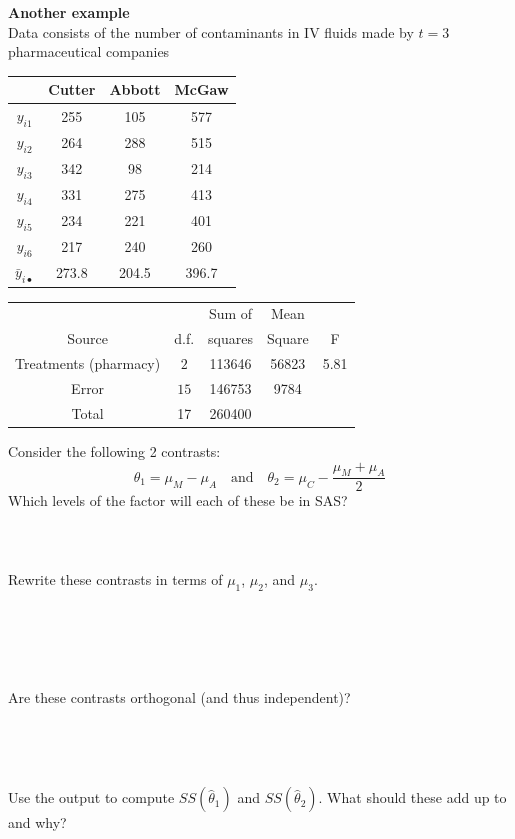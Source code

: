 \newpage

\textbf{Another example}\\
Data consists of the number of contaminants in IV fluids made by $t=3$ pharmaceutical companies
\begin{center}
\begin{tabular}{c|ccc|} \hline
&Cutter & Abbott & McGaw \\ \hline
$y_{i1}$&255 & 105 & 577 \\
$y_{i2}$&264 & 288 & 515 \\
$y_{i3}$&342 & 98 & 214 \\
$y_{i4}$&331 & 275 & 413 \\
$y_{i5}$&234 & 221 & 401 \\
$y_{i6}$&217 & 240 & 260 \\ \hline
$\bar{y}_{i\bullet}$ &273.8 & 204.5 & 396.7 \\ \hline
\end{tabular}
\end{center}
\begin{center}
\begin{tabular}{|c|c|c|c|c|}  \hline
& & Sum of & Mean & \\
Source & d.f. & squares & Square & F \\ \hline
Treatments (pharmacy) & $2$ & 113646 & 56823 & 5.81\\
Error & $15$ & 146753 & 9784 & \\
Total & 17 & 260400 & & \\ \hline
\end{tabular}
\end{center}
Consider the following 2 contrasts:
$$ \theta_1 = \mu_M-\mu_A \ \ \ \mbox{ and }\ \ \ \theta_2=\mu_C-\frac{\mu_M+\mu_A}{2}$$
Which levels of the factor will each of these be in SAS? \\~\\~\\~\\
Rewrite these contrasts in terms of $\mu_1$, $\mu_2$, and $\mu_3$.\\~\\~\\~\\~\\~\\
Are these contrasts orthogonal (and thus independent)?\\~\\~\\~\\~\\
Use the output to compute $SS(\hat\theta_1)$ and $SS(\hat\theta_2)$.  What should these add up to and why?

